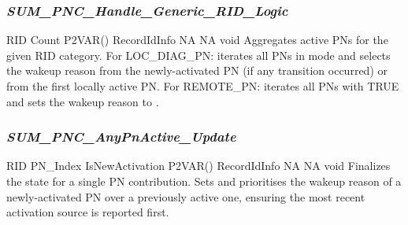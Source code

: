 { }

\subsubsection{\textit{SUM\_PNC\_Handle\_Generic\_RID\_Logic}}

{ \hspace*{1.5in} \vrule \hspace*{0.1in} RID \newline
  \hspace*{1.5in} \vrule \hspace*{0.1in} Count \newline
 P2VAR() \hspace*{0.8in} \vrule \hspace*{0.1in} RecordIdInfo}
{NA}
{NA}
{void}
{Aggregates active PNs for the given RID category. For LOC\_DIAG\_PN: iterates all PNs in  mode and selects the wakeup reason from the newly-activated PN (if any transition occurred) or from the first locally active PN. For REMOTE\_PN: iterates all PNs with  TRUE and sets the wakeup reason to .}

{}

\subsubsection{\textit{SUM\_PNC\_AnyPnActive\_Update}}

{ \hspace*{1.5in} \vrule \hspace*{0.1in} RID \newline
  \hspace*{1.5in} \vrule \hspace*{0.1in} PN\_Index \newline
  \hspace*{1.5in} \vrule \hspace*{0.1in} IsNewActivation \newline
 P2VAR() \hspace*{0.8in} \vrule \hspace*{0.1in} RecordIdInfo}
{NA}
{NA}
{void}
{Finalizes the  state for a single PN contribution. Sets  and prioritises the wakeup reason of a newly-activated PN over a previously active one, ensuring the most recent activation source is reported first.}

